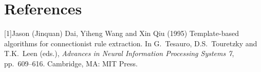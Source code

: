 \documentclass{article}
\begin{document}
\newpage

\section*{References}

\medskip

\small

[1]Jason (Jinquan) Dai, Yiheng Wang and Xin Qiu (1995) Template-based algorithms
for connectionist rule extraction. In G.\ Tesauro, D.S.\ Touretzky and
T.K.\ Leen (eds.), {\it Advances in Neural Information Processing
  Systems 7}, pp.\ 609--616. Cambridge, MA: MIT Press.
\end{document}
